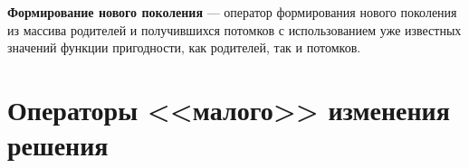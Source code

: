 \documentclass[a4paper,12pt]{article}
\begin{document}
\textbf{Формирование нового поколения} --- оператор формирования нового поколения из массива родителей и получившихся потомков с использованием уже известных значений функции пригодности, как родителей, так и потомков.





\section{Операторы <<малого>> изменения решения}\label{SetOfOperatorsAlgorithms:section_change}




\cleardoublepage
{}
{}
\newpage
\end{document}
